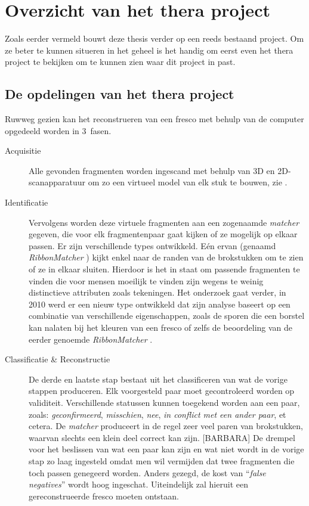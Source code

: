 \chapter{Overzicht van het thera project}
\label{hoofdstuk:overzicht}
Zoals eerder vermeld bouwt deze thesis verder op een reeds bestaand project. Om ze beter te kunnen situeren in het geheel is het handig om eerst even het thera project te bekijken om te kunnen zien waar dit project in past.

\section{De opdelingen van het thera project}
Ruwweg gezien kan het reconstrueren van een fresco met behulp van de computer opgedeeld worden in 3~fasen.

\begin{description}
	\item[Acquisitie] Alle gevonden fragmenten worden ingescand met behulp van 3D en 2D-scanapparatuur om zo een virtueel model van elk stuk te bouwen, zie \cite{Brown2008}.  
	\item[Identificatie] Vervolgens worden deze virtuele fragmenten aan een zogenaamde \emph{matcher} gegeven, die voor elk fragmentenpaar gaat kijken of ze mogelijk op elkaar passen. Er zijn verschillende types ontwikkeld. E\'en ervan (genaamd \emph{RibbonMatcher} \cite{Brown2008}) kijkt enkel naar de randen van de brokstukken om te zien of ze in elkaar sluiten. Hierdoor is het in staat om passende fragmenten te vinden die voor mensen moeilijk te vinden zijn wegens te weinig distinctieve attributen zoals tekeningen. Het onderzoek gaat verder, in 2010 werd er een nieuw type ontwikkeld dat zijn analyse baseert op een combinatie van verschillende eigenschappen, zoals de sporen die een borstel kan nalaten bij het kleuren van een fresco of zelfs de beoordeling van de eerder genoemde \emph{RibbonMatcher} \cite{TolerFranklin2010}.
	\item[Classificatie \& Reconstructie] De derde en laatste stap bestaat uit het classificeren van wat de vorige stappen produceren. Elk voorgesteld paar moet gecontroleerd worden op validiteit. Verschillende statussen kunnen toegekend worden aan een paar, zoals: \emph{geconfirmeerd}, \emph{misschien}, \emph{nee}, \emph{in conflict met een ander paar}, et cetera. De \emph{matcher} produceert in de regel zeer veel paren van brokstukken, waarvan slechts een klein deel correct kan zijn. [BARBARA] De drempel voor het beslissen van wat een paar kan zijn en wat niet wordt in de vorige stap zo laag ingesteld omdat men wil vermijden dat twee fragmenten die toch passen genegeerd worden. Anders gezegd, de kost van ``\emph{false negatives}'' wordt hoog ingeschat. Uiteindelijk zal hieruit een gereconstrueerde fresco moeten ontstaan.
\end{description}

